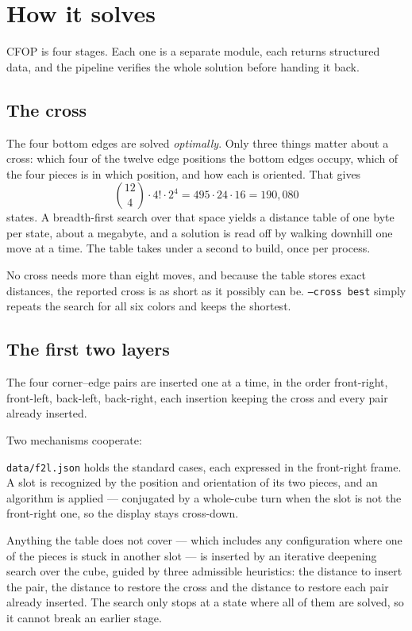 \section{How it solves}
\label{sec:solver}

CFOP is four stages.  Each one is a separate module, each returns structured data,
and the pipeline verifies the whole solution before handing it back.

\subsection{The cross}

The four bottom edges are solved \emph{optimally}.  Only three things matter about
a cross: which four of the twelve edge positions the bottom edges occupy, which of
the four pieces is in which position, and how each is oriented.  That gives
\[
  \binom{12}{4} \cdot 4! \cdot 2^4 = 495 \cdot 24 \cdot 16 = 190{,}080
\]
states.  A breadth-first search over that space yields a distance table of one byte
per state, about a megabyte, and a solution is read off by walking downhill one move
at a time.  The table takes under a second to build, once per process.

No cross needs more than eight moves, and because the table stores exact distances,
the reported cross is as short as it possibly can be.  \texttt{--cross best} simply
repeats the search for all six colors and keeps the shortest.

\subsection{The first two layers}

The four corner--edge pairs are inserted one at a time, in the order front-right,
front-left, back-left, back-right, each insertion keeping the cross and every pair
already inserted.

Two mechanisms cooperate:

\begin{description}[leftmargin=0em,style=nextline]
  \item[The 41 case table] \texttt{data/f2l.json} holds the standard cases, each
  expressed in the front-right frame.  A slot is recognized by the position and
  orientation of its two pieces, and an algorithm is applied --- conjugated by a
  whole-cube turn when the slot is not the front-right one, so the display stays
  cross-down.
  \item[The verified search] Anything the table does not cover --- which includes
  any configuration where one of the pieces is stuck in another slot --- is inserted
  by an iterative deepening search over the cube, guided by three admissible
  heuristics: the distance to insert the pair, the distance to restore the cross and
  the distance to restore each pair already inserted.  The search only stops at a
  state where all of them are solved, so it cannot break an earlier stage.
\end{description}

